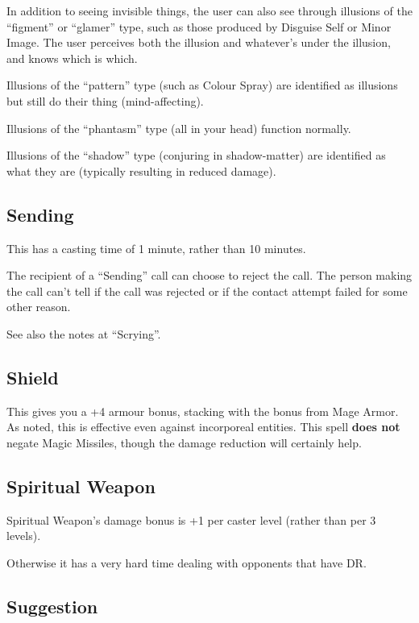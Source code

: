 In addition to seeing invisible things, the user can also see through
illusions of the ``figment'' or ``glamer'' type, such as those produced by
Disguise Self or Minor Image. The user perceives both the illusion and
whatever's under the illusion, and knows which is which.

Illusions of the ``pattern'' type (such as Colour Spray) are identified as
illusions but still do their thing (mind-affecting).

Illusions of the ``phantasm'' type (all in your head) function normally.

Illusions of the ``shadow'' type (conjuring in shadow-matter) are
identified as what they are (typically resulting in reduced damage).
%

%
\subsection{Sending}

This has a casting time of 1 minute, rather than 10 minutes.

The recipient of a ``Sending'' call can choose to reject the call. The
person making the call can't tell if the call was rejected or if the
contact attempt failed for some other reason.

See also the notes at ``Scrying''.
%

%
\subsection{Shield}

This gives you a +4 armour bonus, stacking with the bonus from Mage Armor.
As noted, this is effective even against incorporeal entities. This spell
\textbf{does not} negate Magic Missiles, though the damage reduction will
certainly help.
%

%
\subsection{Spiritual Weapon}

Spiritual Weapon's damage bonus is +1 per caster level (rather than per
3 levels).

Otherwise it has a very hard time dealing with opponents that have DR.
%

%
\subsection{Suggestion}

